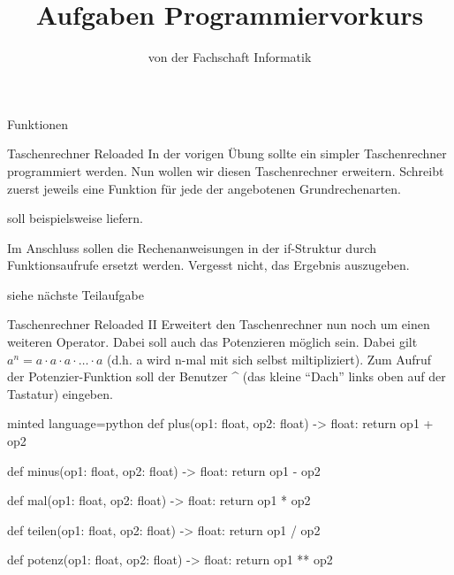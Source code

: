 
\title{Aufgaben Programmiervorkurs}
\subtitle{von der Fachschaft Informatik\hfill\ptitle}

\maketitle{}

\begin{task}[points=auto]{Funktionen}
    \begin{subtask*}[points=0]{Taschenrechner Reloaded }
        In der vorigen Übung sollte ein simpler Taschenrechner programmiert werden. Nun wollen wir diesen Taschenrechner erweitern. Schreibt zuerst jeweils eine Funktion für jede der angebotenen Grundrechenarten.

         soll beispielsweise  liefern.

        Im Anschluss sollen die Rechenanweisungen in der if-Struktur durch Funktionsaufrufe ersetzt werden. Vergesst nicht, das Ergebnis auszugeben.

        \begin{solution}
            siehe nächste Teilaufgabe
        \end{solution}
    \end{subtask*}
    \begin{subtask*}[points=0]{Taschenrechner Reloaded II }
        Erweitert den Taschenrechner nun noch um einen weiteren Operator. Dabei soll auch das Potenzieren möglich sein. Dabei gilt $a^n=a\cdot a\cdot a \cdot\ldots\cdot a$ (d.h. a wird n-mal mit sich selbst miltipliziert). Zum Aufruf der Potenzier-Funktion soll der Benutzer \^{} (das kleine "`Dach"' links oben auf der Tastatur) eingeben.

        \begin{solution}
            \begin{codeBlock}[]{minted language=python}
                def plus(op1: float, op2: float) -> float:
                    return op1 + op2

                def minus(op1: float, op2: float) -> float:
                    return op1 - op2

                def mal(op1: float, op2: float) -> float:
                    return op1 * op2

                def teilen(op1: float, op2: float) -> float:
                    return op1 / op2

                def potenz(op1: float, op2: float) -> float:
                    return op1 ** op2


\end{codeBlock}
\end{solution}
\end{subtask*}
\end{task}
